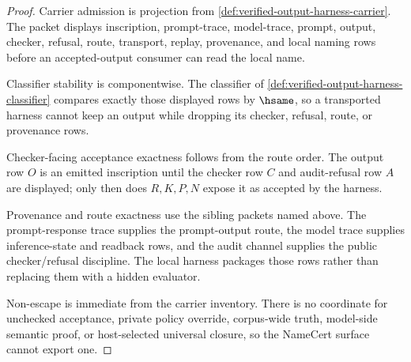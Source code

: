 \begin{proof}
Carrier admission is projection from \autoref{def:verified-output-harness-carrier}. The packet displays inscription, prompt-trace, model-trace, prompt, output, checker, refusal, route, transport, replay, provenance, and local naming rows before an accepted-output consumer can read the local name.

Classifier stability is componentwise. The classifier of \autoref{def:verified-output-harness-classifier} compares exactly those displayed rows by $\hsame$, so a transported harness cannot keep an output while dropping its checker, refusal, route, or provenance rows.

Checker-facing acceptance exactness follows from the route order. The output row $O$ is an emitted inscription until the checker row $C$ and audit-refusal row $A$ are displayed; only then does $R,K,P,N$ expose it as accepted by the harness.

Provenance and route exactness use the sibling packets named above. The prompt-response trace supplies the prompt-output route, the model trace supplies inference-state and readback rows, and the audit channel supplies the public checker/refusal discipline. The local harness packages those rows rather than replacing them with a hidden evaluator.

Non-escape is immediate from the carrier inventory. There is no coordinate for unchecked acceptance, private policy override, corpus-wide truth, model-side semantic proof, or host-selected universal closure, so the NameCert surface cannot export one.
\end{proof}

